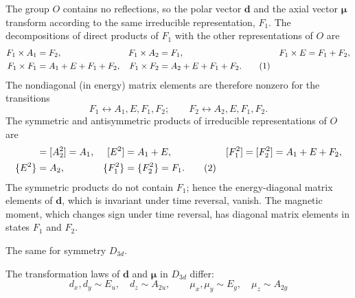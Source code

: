 \SolutionHeading The group $O$ contains no reflections, so the polar vector $\mathbf d$ and the axial vector $\boldsymbol\mu$ transform according to the same irreducible representation, $F_1$. The decompositions of direct products of $F_1$ with the other representations of $O$ are
\begin{align}
 F_1\times A_1&=F_2,&F_1\times A_2&=F_1,&F_1\times E&=F_1+F_2,\notag\\
 F_1\times F_1&=A_1+E+F_1+F_2,&F_1\times F_2&=A_2+E+F_1+F_2.\tag{1}
\end{align}
The nondiagonal (in energy) matrix elements are therefore nonzero for the transitions
\[
 F_1\leftrightarrow A_1,E,F_1,F_2;\qquad F_2\leftrightarrow A_2,E,F_1,F_2.
\]
The symmetric and antisymmetric products of irreducible representations of $O$ are
\begin{align}
 [A_1^2]&=[A_2^2]=A_1,&[E^2]&=A_1+E,&[F_1^2]&=[F_2^2]=A_1+E+F_2,\notag\\
 \{E^2\}&=A_2,&\{F_1^2\}&=\{F_2^2\}=F_1.\tag{2}
\end{align}
The symmetric products do not contain $F_1$; hence the energy-diagonal matrix elements of $\mathbf d$, which is invariant under time reversal, vanish. The magnetic moment, which changes sign under time reversal, has diagonal matrix elements in states $F_1$ and $F_2$.

 The same for symmetry $D_{3d}$.

\SolutionHeading The transformation laws of $\mathbf d$ and $\boldsymbol\mu$ in $D_{3d}$ differ:
\[
 d_x,d_y\sim E_u,\quad d_z\sim A_{2u},\qquad
 \mu_x,\mu_y\sim E_g,\quad \mu_z\sim A_{2g}
\]

